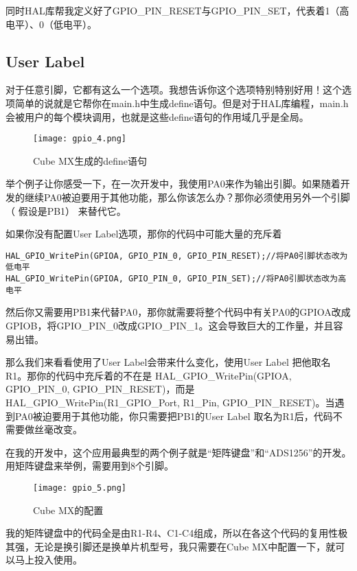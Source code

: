 \documentclass[cn,11pt]{elegantbook}
\begin{document}
同时HAL库帮我定义好了GPIO\_PIN\_RESET与GPIO\_PIN\_SET，代表着1（高电平）、0（低电平）。


\subsection{User Label}

对于任意引脚，它都有这么一个选项。我想告诉你这个选项特别特别好用！这个选项简单的说就是它帮你在main.h中生成define语句。但是对于HAL库编程，main.h会被用户的每个模块调用，也就是这些define语句的作用域几乎是全局。


\begin{figure}[htbp]
	\centering
	\texttt{[image: gpio\_4.png]}
	\caption{Cube MX生成的define语句 \label{fig:scatter}}
\end{figure}

举个例子让你感受一下，在一次开发中，我使用PA0来作为输出引脚。如果随着开发的继续PA0被迫要用于其他功能，那么你该怎么办？那你必须使用另外一个引脚（ 假设是PB1） 来替代它。

如果你没有配置User Label选项，那你的代码中可能大量的充斥着
\lstset{  language=C}
\begin{lstlisting}
HAL_GPIO_WritePin(GPIOA, GPIO_PIN_0, GPIO_PIN_RESET);//将PA0引脚状态改为低电平
HAL_GPIO_WritePin(GPIOA, GPIO_PIN_0, GPIO_PIN_SET);//将PA0引脚状态改为高电平
\end{lstlisting}

然后你又需要用PB1来代替PA0，那你就需要将整个代码中有关PA0的GPIOA改成GPIOB，将GPIO\_PIN\_0改成GPIO\_PIN\_1。这会导致巨大的工作量，并且容易出错。

那么我们来看看使用了User Label会带来什么变化，使用User Label 把他取名R1。那你的代码中充斥着的不在是 HAL\_GPIO\_WritePin(GPIOA, GPIO\_PIN\_0, GPIO\_PIN\_RESET)，而是HAL\_GPIO\_WritePin(R1\_GPIO\_Port, R1\_Pin, GPIO\_PIN\_RESET)。当遇到PA0被迫要用于其他功能，你只需要把PB1的User Label 取名为R1后，代码不需要做丝毫改变。

在我的开发中，这个应用最典型的两个例子就是“矩阵键盘”和“ADS1256”的开发。用矩阵键盘来举例，需要用到8个引脚。

\begin{figure}[htbp]
	\centering
	\texttt{[image: gpio\_5.png]}
	\caption{Cube MX的配置\label{fig:scatter}}
\end{figure}

我的矩阵键盘中的代码全是由R1-R4、C1-C4组成，所以在各这个代码的复用性极其强，无论是换引脚还是换单片机型号，我只需要在Cube MX中配置一下，就可以马上投入使用。
\end{document}

